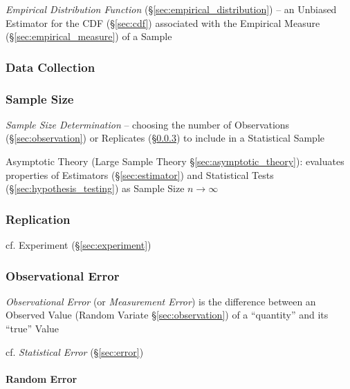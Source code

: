 \emph{Empirical Distribution Function} (\S\ref{sec:empirical_distribution}) --
an Unbiased Estimator for the CDF (\S\ref{sec:cdf}) associated with the
Empirical Measure (\S\ref{sec:empirical_measure}) of a Sample



\subsubsection{Data Collection}\label{sec:data_collection}




\subsubsection{Sample Size}\label{sec:sample_size}

\emph{Sample Size Determination} -- choosing the number of Observations
(\S\ref{sec:observation}) or Replicates (\S\ref{sec:replication}) to include in
a Statistical Sample

\fist Asymptotic Theory (Large Sample Theory \S\ref{sec:asymptotic_theory}):
evaluates properties of Estimators (\S\ref{sec:estimator}) and Statistical Tests
(\S\ref{sec:hypothesis_testing}) as Sample Size $n \to \infty$



\subsubsection{Replication}\label{sec:replication}

cf. Experiment (\S\ref{sec:experiment})



\subsubsection{Observational Error}\label{sec:observational_error}

\emph{Observational Error} (or \emph{Measurement Error}) is the difference
between an Observed Value (Random Variate \S\ref{sec:observation}) of a
``quantity'' and its ``true'' Value

cf. \emph{Statistical Error} (\S\ref{sec:error})



\paragraph{Random Error}\label{sec:random_error}\hfill

